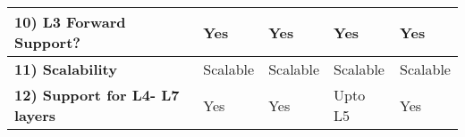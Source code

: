 \begin{table}[ht!]
\begin{adjustbox}{width=1.25\textwidth, center}
\begin{tabular}{| L{3cm} | L{3cm} | L{3cm} | L{3cm} | L{3cm} |}
            \textbf{10) L3 Forward Support?} &
            Yes &
            Yes &
            Yes &
            Yes
            \\ \hline
            \textbf{11) Scalability} &
            Scalable &
            Scalable &
            Scalable &
            Scalable
            \\ \hline
            \textbf{12) Support for L4- L7 layers} &
            Yes &
            Yes &
            Upto L5 &
            Yes
            \\ \hline
        \end{tabular}
    \end{adjustbox}
\end{table}
